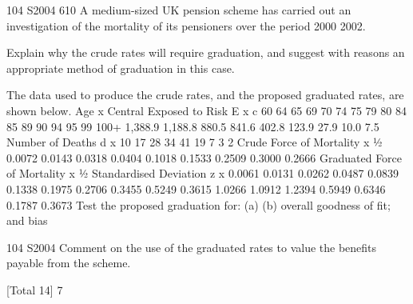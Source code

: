 \documentclass[a4paper,12pt]{article}
\begin{document}
104 S2004
610
A medium-sized UK pension scheme has carried out an investigation of the mortality
of its pensioners over the period 2000 2002.
\item  Explain why the crude rates will require graduation, and suggest with reasons
an appropriate method of graduation in this case.

\item  The data used to produce the crude rates, and the proposed graduated rates, are
shown below.
Age
x Central
Exposed to
Risk
E x c
60 64
65 69
70 74
75 79
80 84
85 89
90 94
95 99
100+ 1,388.9
1,188.8
880.5
841.6
402.8
123.9
27.9
10.0
7.5
Number
of Deaths
d x
10
17
28
34
41
19
7
3
2
Crude
Force of
Mortality
x 1⁄2
0.0072
0.0143
0.0318
0.0404
0.1018
0.1533
0.2509
0.3000
0.2666
Graduated
Force of
Mortality
x 1⁄2 Standardised
Deviation
z x
0.0061
0.0131
0.0262
0.0487
0.0839
0.1338
0.1975
0.2706
0.3455 0.5249
0.3615
1.0266
1.0912
1.2394
0.5949
0.6346
0.1787
0.3673
Test the proposed graduation for:
(a)
(b)
overall goodness of fit; and
bias

\item 
104 S2004
Comment on the use of the graduated rates to value the benefits payable from
the scheme.

[Total 14]
7
\end{document}
